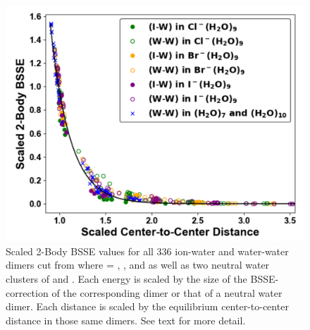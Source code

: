\begin{figure}[t]
\uwsinglespace
\centering
\begin{adjustbox}{max size={.6\textwidth}{.6\textheight}}
\includegraphics[width=\textwidth]{Figures/Chapter_3/figure_12.pdf}
\end{adjustbox}
\begin{spacing}{1.0}
\caption[Scaled 2-Body BSSE values for all 336 ion-water and water-water dimers cut from  where  = , , and  as well as two neutral water clusters of  and . Each energy is scaled by the size of the BSSE-correction of the corresponding  dimer or that of a neutral water dimer. Each distance is scaled by the equilibrium center-to-center distance in those same dimers.]{Scaled 2-Body BSSE values for all 336 ion-water and water-water dimers cut from  where  = , , and  as well as two neutral water clusters of  and . Each energy is scaled by the size of the BSSE-correction of the corresponding  dimer or that of a neutral water dimer. Each distance is scaled by the equilibrium center-to-center distance in those same dimers. See text for more detail.}\label{fig:MBE_II_12}
\end{spacing}
\end{figure}